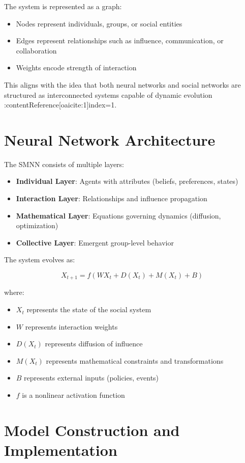 \documentclass[12pt]{article}
\begin{document}
The system is represented as a graph:

\begin{itemize}
\item Nodes represent individuals, groups, or social entities
\item Edges represent relationships such as influence, communication, or collaboration
\item Weights encode strength of interaction
\end{itemize}

This aligns with the idea that both neural networks and social networks are structured as interconnected systems capable of dynamic evolution :contentReference[oaicite:1]{index=1}.

\section{Neural Network Architecture}

The SMNN consists of multiple layers:

\begin{itemize}
\item \textbf{Individual Layer}: Agents with attributes (beliefs, preferences, states)
\item \textbf{Interaction Layer}: Relationships and influence propagation
\item \textbf{Mathematical Layer}: Equations governing dynamics (diffusion, optimization)
\item \textbf{Collective Layer}: Emergent group-level behavior
\end{itemize}

The system evolves as:

\[
X_{t+1} = f(WX_t + D(X_t) + M(X_t) + B)
\]

where:
\begin{itemize}
\item $X_t$ represents the state of the social system
\item $W$ represents interaction weights
\item $D(X_t)$ represents diffusion of influence
\item $M(X_t)$ represents mathematical constraints and transformations
\item $B$ represents external inputs (policies, events)
\item $f$ is a nonlinear activation function
\end{itemize}

\section{Model Construction and Implementation}
\end{document}
